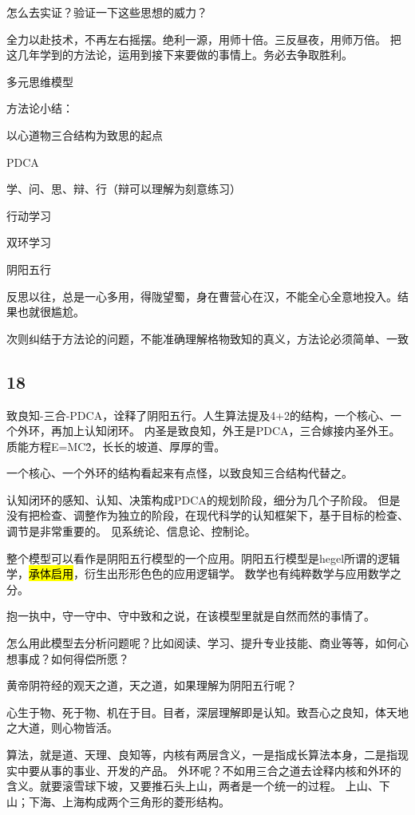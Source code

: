怎么去实证？验证一下这些思想的威力？

全力以赴技术，不再左右摇摆。绝利一源，用师十倍。三反昼夜，用师万倍。
把这几年学到的方法论，运用到接下来要做的事情上。务必去争取胜利。

多元思维模型

方法论小结：
\begin{enumbox}
\item 以心道物三合结构为致思的起点
\item PDCA
\item 学、问、思、辩、行（辩可以理解为刻意练习）
\item 行动学习
\item 双环学习
\item 阴阳五行
\end{enumbox}

反思以往，总是一心多用，得陇望蜀，身在曹营心在汉，不能全心全意地投入。结果也就很尴尬。

次则纠结于方法论的问题，不能准确理解格物致知的真义，方法论必须简单、一致

\subsection{18}

致良知-三合-PDCA，诠释了阴阳五行。人生算法提及4+2的结构，一个核心、一个外环，再加上认知闭环。
内圣是致良知，外王是PDCA，三合嫁接内圣外王。质能方程E=MC\^2，长长的坡道、厚厚的雪。

一个核心、一个外环的结构看起来有点怪，以致良知三合结构代替之。

认知闭环的感知、认知、决策构成PDCA的规划阶段，细分为几个子阶段。
但是没有把检查、调整作为独立的阶段，在现代科学的认知框架下，基于目标的检查、调节是非常重要的。
见系统论、信息论、控制论。

整个模型可以看作是阴阳五行模型的一个应用。阴阳五行模型是hegel所谓的逻辑学，\hl{承体启用}，衍生出形形色色的应用逻辑学。
数学也有纯粹数学与应用数学之分。

抱一执中，守一守中、守中致和之说，在该模型里就是自然而然的事情了。

怎么用此模型去分析问题呢？比如阅读、学习、提升专业技能、商业等等，如何心想事成？如何得偿所愿？

黄帝阴符经的观天之道，天之道，如果理解为阴阳五行呢？

心生于物、死于物、机在于目。目者，深层理解即是认知。致吾心之良知，体天地之大道，则心物皆活。

算法，就是道、天理、良知等，内核有两层含义，一是指成长算法本身，二是指现实中要从事的事业、开发的产品。
外环呢？不如用三合之道去诠释内核和外环的含义。就要滚雪球下坡，又要推石头上山，两者是一个统一的过程。
上山、下山；下海、上海构成两个三角形的菱形结构。

